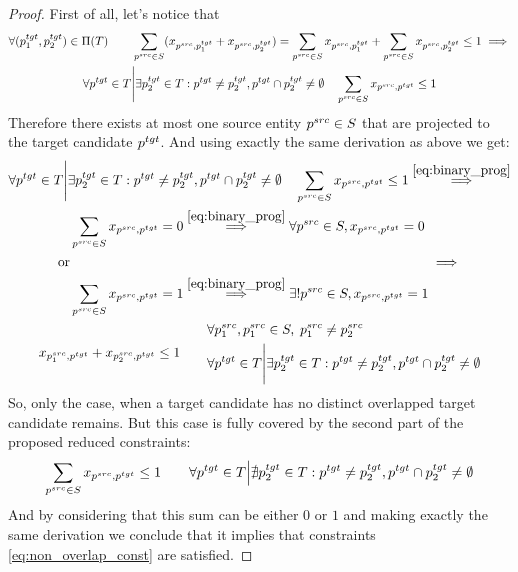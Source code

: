 \begin{proof}
  First of all, let's notice that
  \begin{multline*}
    \forall (p_1^{tgt}, p_2^{tgt}) \in \Pi(T)
    \qquad
    \sum\limits_{p^{src} \in S} (x_{p^{src}, p_1^{tgt}} + x_{p^{src}, p_2^{tgt}})
    =
    \sum\limits_{p^{src} \in S} x_{p^{src}, p_1^{tgt}} +
    \sum\limits_{p^{src} \in S} x_{p^{src}, p_2^{tgt}} \leq 1
    \implies                        \\
    \forall p^{tgt} \in T \Bigg| \exists p_2^{tgt} \in T: p^{tgt} \neq p_2^{tgt}, p^{tgt} \cap p_2^{tgt} \neq \emptyset
    \quad
    \sum\limits_{p^{src} \in S} x_{p^{src}, p^{tgt}} \leq 1
  \end{multline*}
  Therefore there exists at most one source entity \( p^{src} \in S \) that are projected
  to the target candidate \( p^{tgt} \).
  And using exactly the same derivation as above we get:
  \begin{multline*}
    \forall p^{tgt} \in T \Bigg| \exists p_2^{tgt} \in T: p^{tgt} \neq p_2^{tgt}, p^{tgt} \cap p_2^{tgt} \neq \emptyset
    \quad
    \sum\limits_{p^{src} \in S} x_{p^{src}, p^{tgt}} \leq 1
    \stackrel{\eqref{eq:binary_prog}}{\implies}                                                                                                                                                       \\
    \begin{aligned}
      & \sum\limits_{p^{src} \in S} x_{p^{src}, p^{tgt}} = 0
      \stackrel{\eqref{eq:binary_prog}}{\implies}
      \forall p^{src} \in S, x_{p^{src}, p^{tgt}} = 0         \\
      \text{or}                                               \\
      & \sum\limits_{p^{src} \in S} x_{p^{src}, p^{tgt}} = 1
      \stackrel{\eqref{eq:binary_prog}}{\implies}
      \exists! p^{src} \in S, x_{p^{src}, p^{tgt}} = 1        \\
    \end{aligned} \implies \\
    x_{p_1^{src}, p^{tgt}} + x_{p_2^{src}, p^{tgt}} \leq 1 \qquad
    \begin{aligned}
      & \forall p_1^{src}, p_1^{src} \in S, \; p_1^{src} \neq p_2^{src}                                                        \\
      & \forall p^{tgt} \in T \Bigg| \exists p_2^{tgt} \in T: p^{tgt} \neq p_2^{tgt}, p^{tgt} \cap p_2^{tgt} \neq \emptyset
    \end{aligned}
  \end{multline*}
  So, only the case, when a target candidate has no distinct overlapped target candidate remains.
  But this case is fully covered by the second part of the proposed reduced constraints:
  \[
    \sum\limits_{p^{src} \in S} x_{p^{src}, p^{tgt}} \leq 1 \qquad
    \forall p^{tgt} \in T \Big| \nexists p_2^{tgt} \in T: p^{tgt} \neq p_2^{tgt}, p^{tgt} \cap p_2^{tgt} \neq \emptyset
  \]
  And by considering that this sum can be either \( 0 \) or \( 1 \) and making
  exactly the same derivation we conclude that it implies that
  constraints \eqref{eq:non_overlap_const} are satisfied.
\end{proof}

